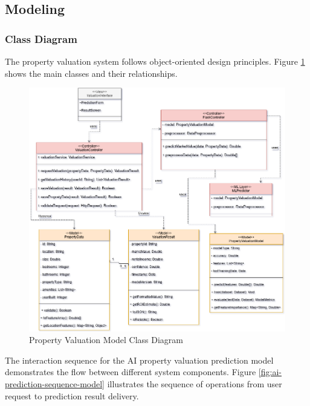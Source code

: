 \subsection{Modeling}
\subsubsection{Class Diagram}
The property valuation system follows object-oriented design principles. Figure \ref{fig:valuation-class-diagram} shows the main classes and their relationships.

\newpage
\begin{figure}[htbp]
    \centering
    \includegraphics[width=1\textwidth]{images/valuation_class_diagram.png}
    \caption{Property Valuation Model Class Diagram}
    \label{fig:valuation-class-diagram}
\end{figure}


The interaction sequence for the AI property valuation prediction model demonstrates the flow between different system components. Figure \ref{fig:ai-prediction-sequence-model} illustrates the sequence of operations from user request to prediction result delivery.

